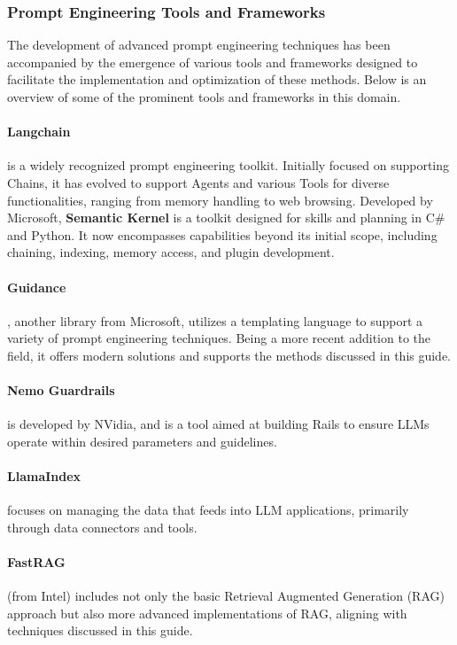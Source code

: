 \documentclass[conference]{IEEEtran}
\begin{document}
\iffalse

\subsubsection{Prompt Engineering Tools and Frameworks}
The development of advanced prompt engineering techniques has been accompanied by the emergence of various tools and frameworks designed to facilitate the implementation and optimization of these methods. Below is an overview of some of the prominent tools and frameworks in this domain.

\paragraph{Langchain} is a widely recognized prompt engineering toolkit. Initially focused on supporting Chains, it has evolved to support Agents and various Tools for diverse functionalities, ranging from memory handling to web browsing.
Developed by Microsoft, \textbf{Semantic Kernel} is a toolkit designed for skills and planning in C\# and Python. It now encompasses capabilities beyond its initial scope, including chaining, indexing, memory access, and plugin development.

\paragraph{Guidance}, another library from Microsoft, utilizes a templating language to support a variety of prompt engineering techniques. Being a more recent addition to the field, it offers modern solutions and supports the methods discussed in this guide.

\paragraph{Nemo Guardrails} is developed by NVidia, and is a tool aimed at building Rails to ensure LLMs operate within desired parameters and guidelines.

\paragraph{LlamaIndex} focuses on managing the data that feeds into LLM applications, primarily through data connectors and tools.

\paragraph{FastRAG} (from Intel) includes not only the basic Retrieval Augmented Generation (RAG) approach but also more advanced implementations of RAG, aligning with techniques discussed in this guide.
\end{document}

